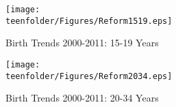 \begin{figure}[htpb!]
\begin{center}
\caption{Birth Trends 2000-2011: 15-19 Years}
\vspace{-5mm}
\label{TEENfig:Trend1519}
\texttt{[image: \\teenfolder/Figures/Reform1519.eps]} 
\end{center}
\end{figure}

\begin{figure}[htpb!]
\begin{center}
\caption{Birth Trends 2000-2011: 20-34 Years}
\vspace{-5mm}
\label{TEENfig:Trend2034}
\texttt{[image: \\teenfolder/Figures/Reform2034.eps]} 
\end{center}
\end{figure}
